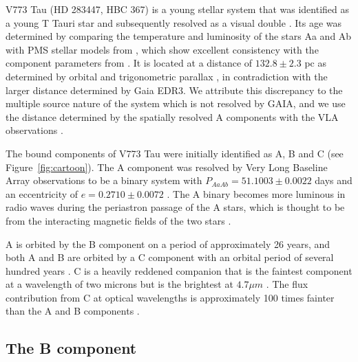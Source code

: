 \documentclass{aa}
\begin{document}
V773 Tau (HD 283447, HBC 367) is a young \citep[$3\pm1$ Myr;][]{Boden07} stellar system that was identified as a young T Tauri star \citep{Rydgren76} and subsequently resolved as a visual double \citep{Ghez93,Leinert93}.
%
Its age was determined by comparing the temperature and luminosity of the stars Aa and Ab with PMS stellar models from \citet{Montalban06}, which show excellent consistency with the component parameters from \citet{Boden07}.
%
It is located at a distance of $132.8\pm 2.3 $ pc as determined by orbital and trigonometric parallax \citep{Torres12}, in contradiction with the larger distance determined by Gaia EDR3.
%
We attribute this discrepancy to the multiple source nature of the system which is not resolved by GAIA, and we use the distance determined by the spatially resolved A components with the VLA observations \citep{Torres12}.

The bound components of V773 Tau were initially identified as A, B and C (see Figure~\ref{fig:cartoon}).
%
The A component was resolved by Very Long Baseline Array observations to be a binary system with $P_{AaAb}=51.1003\pm 0.0022$ days and an eccentricity of $e=0.2710\pm 0.0072$ \citep{Torres12}.
%
The A binary becomes more luminous in radio waves during the periastron passage of the A stars, which is thought to be from the interacting magnetic fields of the two stars \citep{Torres12}.

A is orbited by the B component on a period of approximately 26 years, and both A and B are orbited by a C component with an orbital period of several hundred years \citep{Duchene03}.
%
C is a heavily reddened companion that is the faintest component at a wavelength of two microns but is the brightest at $4.7\mu m$ \citep{Duchene03,Woitas03}.
%
The flux contribution from C at optical wavelengths is approximately 100 times fainter than the A and B components \citep{Duchene03}.

\subsection{The B component}
\end{document}
